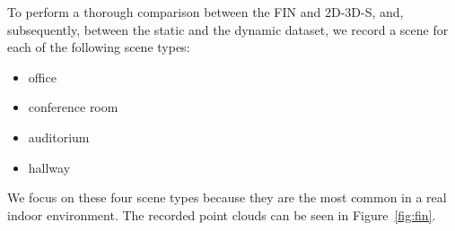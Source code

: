 \documentclass[main.tex]{subfiles}
\begin{document}
To perform a thorough comparison between the FIN and 2D-3D-S, and, subsequently, between the static and the dynamic dataset, we record a scene for each of the following scene types:
\begin{itemize}
    \item office
    \item conference room
    \item auditorium
    \item hallway
\end{itemize}

We focus on these four scene types because they are the most common in a real indoor environment.
The recorded point clouds can be seen in Figure~\ref{fig:fin}.
\end{document}
